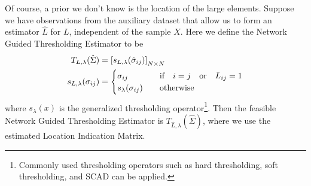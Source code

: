 Of course, a prior we don't know is the location of the large elements. Suppose we have observations from the auxiliary dataset that allow us to form an estimator $\hat{L}$ for $L$, independent of the sample \(X\). Here we define the Network Guided Thresholding Estimator to be 
\begin{align*}
    T_{L,\lambda}(\hat{\Sigma}) &= \bqty{s_{L, \lambda } (\hat{\sigma}_{ij})}_{N\times N}\\
    s_{L,\lambda} \pqty{\sigma_{ij}} &= 
    \begin{cases}
        \sigma_{ij} &\qq{if} i = j \qq{or} L_{ij} = 1\\ 
        s_{\lambda}(\sigma_{ij}) &\qq{otherwise} 
    \end{cases}
    \label{network thresholding estimator}
\end{align*}
where \(s_{\lambda}(x)\) is the generalized thresholding operator\footnote{Commonly used thresholding operators
such as hard thresholding, soft thresholding, and SCAD can be applied.}. Then the feasible Network Guided Thresholding Estimator is $T_{\hat L, \lambda} (\hat \Sigma)$, where we use the estimated Location Indication Matrix.

